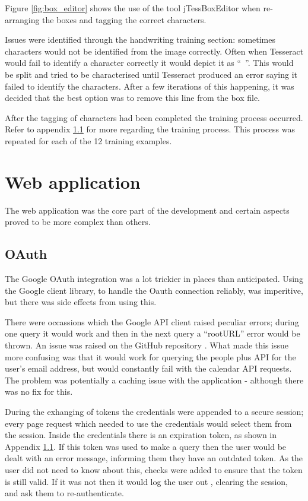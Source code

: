 Figure \ref{fig:box_editor} shows the use of the tool jTessBoxEditor \cite{citeulike:13926798} when re-arranging the boxes and tagging the correct characters.

Issues were identified through the handwriting training section: sometimes characters would not be identified from the image correctly. Often when Tesseract would fail to identify a character correctly it would depict it as ``~''. This would be split and tried to be characterised until Tesseract produced an error saying it failed to identify the characters. After a few iterations of this happening, it was decided that the best option was to remove this line from the box file.

After the tagging of characters had been completed the training process occurred. Refer to appendix \ref{} for more regarding the training process. This process was repeated for each of the 12 training examples.

\section{Web application}
The web application was the core part of the development and certain aspects proved to be more complex than others.
\subsection{OAuth}
The Google OAuth integration was a lot trickier in places than anticipated. Using the Google client library, to handle the Oauth connection reliably, was imperitive, but there was side effects from using this.

There were occassions which the Google API client raised peculiar errors; during one query it would work and then in the next query a ``rootURL'' error would be thrown. An issue was raised on the GitHub repository \cite{citeulike:14021433}. What made this issue more confusing was that it would work for querying the people plus API for the user's email address, but would constantly fail with the calendar API requests. The problem was potentially a caching issue with the application - although there was no fix for this.

During the exhanging of tokens the credentials were appended to a secure session; every page request which needed to use the credentials would select them from the session. Inside the credentials there is an expiration token, as shown in Appendix \ref{}. If this token was used to make a query then the user would be dealt with an error message, informing them they have an outdated token. As the user did not need to know about this, checks were added to ensure that the token is still valid. If it was not then it would log the user out , clearing the session, and ask them to re-authenticate.


